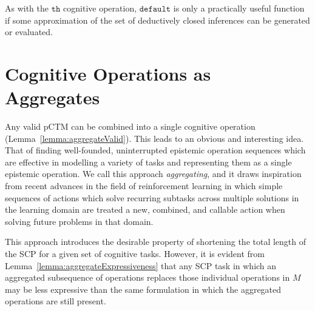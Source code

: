 As with the $\texttt{th}$ cognitive operation, $\texttt{default}$ is only a practically useful function if some approximation of the set of deductively closed inferences can be generated or evaluated.

\section{Cognitive Operations as Aggregates}
Any valid pCTM can be combined into a single cognitive operation (Lemma~\ref{lemma:aggregateValid}). This leads to an obvious and interesting idea. That of finding well-founded, uninterrupted epistemic operation sequences which are effective in modelling a variety of tasks and representing them as a single epistemic operation. We call this approach \textit{aggregating}, and it draws inspiration from recent advances in the field of reinforcement learning\citep{drummond2002accelerating} in which simple sequences of actions which solve recurring subtasks across multiple solutions in the learning domain are treated a new, combined, and callable action when solving future problems in that domain. 

This approach introduces the desirable property of shortening the total length of the SCP for a given set of cognitive tasks. However, it is evident from Lemma~\ref{lemma:aggregateExpressiveness} that any SCP task in which an aggregated subsequence of operations replaces those individual operations in $M$ may be less expressive than the same formulation in which the aggregated operations are still present.

